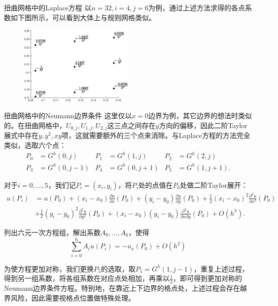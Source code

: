 \documentclass[9pt]{beamer}
\begin{document}
\begin{frame}{扭曲网格中的Laplace方程}
以$n=32,i=4,j=6$为例，通过上述方法求得的各点系数如下图所示，可以看到大体上与规则网格类似。

\begin{figure}[H]
  \centering
  \includegraphics[width=0.5\textwidth]{../report/figure/3-2.eps}
\end{figure}
\end{frame}

\begin{frame}{扭曲网格中的Neumann边界条件}
\small
这里仅以$x=0$边界为例，其它边界的想法时类似的。在扭曲网格中，$U_{0,j},U_{1,j},U_{2,j}$这三点之间存在$y$方向的偏移，因此二阶Taylor展式中存在$y,y^2,xy$项，这就需要额外的三个点来消除。与Laplace方程的方法完全类似，选取六个点：
\begin{align*}
  P_0&=G^h(0,j) & P_1&=G^h(1,j) & P_2&=G^h(2,j)\\
  P_3&=G^h(0,j-1) & P_4&=G^h(0,j+1) & P_5&=G^h(1,j+1).
\end{align*}

\pause
对于$i=0,...,5$，我们记$P_i=(x_i,y_i)$，将$P_i$处的点值在$P_0$处做二阶Taylor展开：
\begin{align*}
  u(P_i)&=u(P_0)+(x_i-x_0)\frac{\partial u}{\partial x}(P_0)+(y_i-y_0)\frac{\partial u}{\partial y}(P_0)
  +\frac{1}{2}(x_i-x_0)^2\frac{\partial^2 u}{\partial x^2}(P_0) \\
  & +\frac{1}{2}(y_i-y_0)^2\frac{\partial^2 u}{\partial y^2}(P_0)
  +(x_i-x_0)(y_i-y_0)\frac{\partial^2 u}{\partial x \partial y}(P_0)+O(h^3).
\end{align*}

\pause
列出六元一次方程组，解出系数$A_0,...,A_6$，使得
\begin{equation*}
  \sum_{i=0}^6 A_iu(P_i)=-u_x(P_0)+O(h^2)
\end{equation*}

为使方程更加对称，我们更换$P_5$的选取，取$P_5=G^h(1,j-1)$，重复上述过程，得到另一组系数，将各组系数在对应点处相加，再乘以$\frac{1}{2}$，即可得到更加对称的Neumann边界条件方程。特别地，在靠近上下边界的格点处，上述过程会存在越界风险，因此需要视格点位置做特殊处理。
\end{frame}
\end{document}
